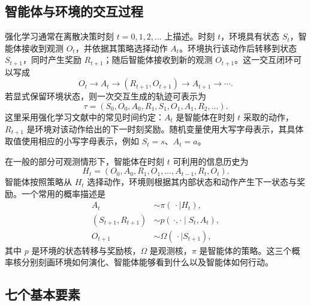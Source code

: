 \subsection{智能体与环境的交互过程}


强化学习通常在离散决策时刻 $t=0,1,2,\ldots$ 上描述。时刻 $t$，环境具有状态 $S_t$，智能体接收到观测 $O_t$，并依据其策略选择动作 $A_t$。环境执行该动作后转移到状态 $S_{t+1}$，同时产生奖励 $R_{t+1}$；随后智能体接收到新的观测 $O_{t+1}$。这一交互闭环可以写成
\[
  O_t \longrightarrow A_t \longrightarrow (R_{t+1},O_{t+1})
  \longrightarrow A_{t+1} \longrightarrow \cdots .
\]
若显式保留环境状态，则一次交互生成的轨迹可表示为
\[
  \tau=(S_0,O_0,A_0,R_1,S_1,O_1,A_1,R_2,\ldots).
\]
这里采用强化学习文献中的常见时间约定：$A_t$ 是智能体在时刻 $t$ 采取的动作，$R_{t+1}$ 是环境对该动作给出的下一时刻奖励。随机变量使用大写字母表示，其具体取值使用相应的小写字母表示，例如 $S_t=s$、$A_t=a$。


在一般的部分可观测情形下，智能体在时刻 $t$ 可利用的信息历史为
\[
  H_t=(O_0,A_0,R_1,O_1,\ldots,A_{t-1},R_t,O_t).
\]
智能体按照策略从 $H_t$ 选择动作，环境则根据其内部状态和动作产生下一状态与奖励。一个常用的概率描述是
\begin{align*}
  A_t &\sim \pi(\,\cdot\mid H_t),\\
  (S_{t+1},R_{t+1}) &\sim p(\,\cdot,\cdot\mid S_t,A_t),\\
  O_{t+1} &\sim \Omega(\,\cdot\mid S_{t+1}),
\end{align*}
其中 $p$ 是环境的状态转移与奖励核，$\Omega$ 是观测核，$\pi$ 是智能体的策略。这三个概率核分别刻画环境如何演化、智能体能够看到什么以及智能体如何行动。


\subsection{七个基本要素}


